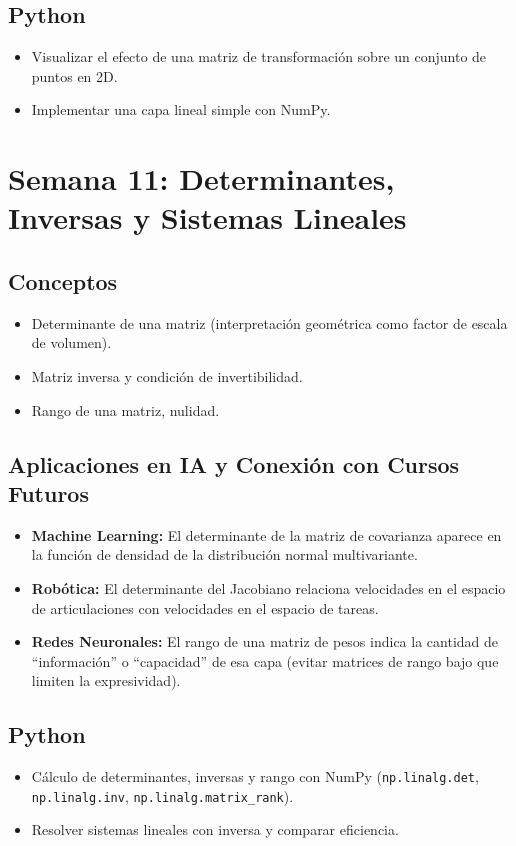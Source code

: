 \documentclass[12pt,a4paper,openany,oneside]{book}
\begin{document}
\subsection{Python}
\begin{itemize}
    \item Visualizar el efecto de una matriz de transformación sobre un conjunto de puntos en 2D.
    \item Implementar una capa lineal simple con NumPy.
\end{itemize}

\section{Semana 11: Determinantes, Inversas y Sistemas Lineales}

\subsection{Conceptos}
\begin{itemize}
    \item Determinante de una matriz (interpretación geométrica como factor de escala de volumen).
    \item Matriz inversa y condición de invertibilidad.
    \item Rango de una matriz, nulidad.
\end{itemize}

\subsection{Aplicaciones en IA y Conexión con Cursos Futuros}
\begin{itemize}
    \item \textbf{Machine Learning:} El determinante de la matriz de covarianza aparece en la función de densidad de la distribución normal multivariante.
    \item \textbf{Robótica:} El determinante del Jacobiano relaciona velocidades en el espacio de articulaciones con velocidades en el espacio de tareas.
    \item \textbf{Redes Neuronales:} El rango de una matriz de pesos indica la cantidad de ``información'' o ``capacidad'' de esa capa (evitar matrices de rango bajo que limiten la expresividad).
\end{itemize}

\subsection{Python}
\begin{itemize}
    \item Cálculo de determinantes, inversas y rango con NumPy (\texttt{np.linalg.det}, \texttt{np.linalg.inv}, \texttt{np.linalg.matrix\_rank}).
    \item Resolver sistemas lineales con inversa y comparar eficiencia.
\end{itemize}
\end{document}

